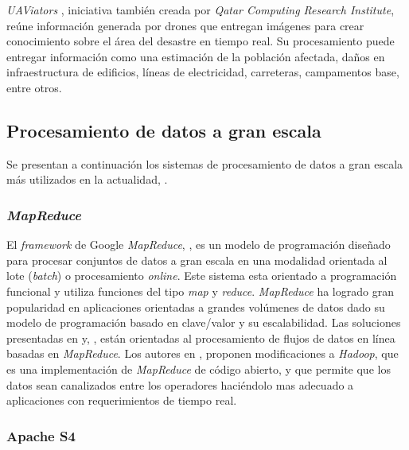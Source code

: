 \textit{UAViators} \cite{UAViators}, iniciativa también creada por \textit{Qatar Computing Research Institute}, reúne información generada por drones que entregan imágenes para crear conocimiento sobre el área del desastre en tiempo real. Su procesamiento puede entregar información como una estimación de la población afectada, daños en infraestructura de edificios, líneas de electricidad, carreteras, campamentos base, entre otros.

\subsection{Procesamiento de datos a gran escala}
\label{arte:SPS}

Se presentan a continuación los sistemas de procesamiento de datos a gran escala más utilizados en la actualidad, \cite{PMIProfes}.

\subsubsection*{\textit{MapReduce}}
\label{arte:SPS:mapreduce}

El \textit{framework} de Google \textit{MapReduce}, \cite{DeanMapReduce}, es un modelo de programación diseñado para procesar conjuntos de datos a gran escala en una modalidad orientada al lote (\textit{batch}) o procesamiento \textit{online}. Este sistema esta orientado a programación funcional y utiliza funciones del tipo \textit{map} y \textit{reduce}. \textit{MapReduce} ha logrado gran popularidad en aplicaciones orientadas a grandes volúmenes de datos dado su modelo de programación basado en clave/valor y su escalabilidad. Las soluciones presentadas en  y, \cite{VermaMapReduce}, están orientadas al procesamiento de flujos de datos en línea basadas en \textit{MapReduce}. Los autores en \cite{CondieMapReduce}, proponen modificaciones a \textit{Hadoop}, que es una implementación de \textit{MapReduce} de código abierto, y que permite que los datos sean canalizados entre los operadores haciéndolo mas adecuado a aplicaciones con requerimientos de tiempo real. 

\subsubsection*{Apache S4}
\label{arte:SPS:s4}
					
